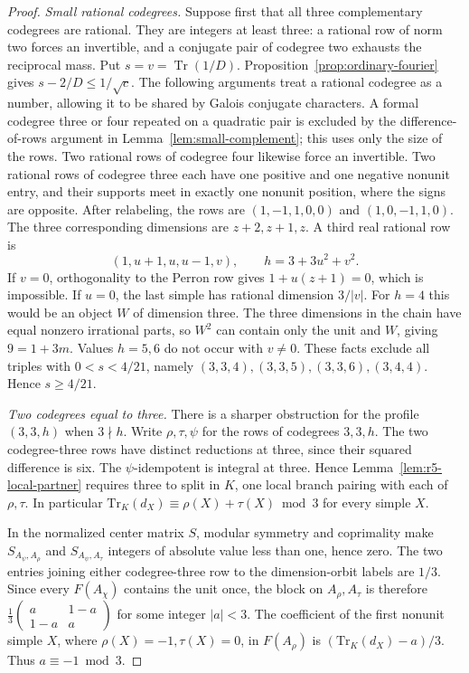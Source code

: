 \documentclass[11pt,a4paper]{article}
\numberwithin{equation}{section}
\begin{document}
\begin{proof}
\par\smallskip\noindent\emph{Small rational codegrees.}\enspace
Suppose first that all three complementary codegrees are rational.
They are integers at least three: a rational row of norm two forces
an invertible, and a conjugate pair of codegree two exhausts the
reciprocal mass. Put $s=v=\operatorname{Tr}(1/D)$.
Proposition~\ref{prop:ordinary-fourier} gives $s-2/D\le1/\sqrt c$.
The following arguments treat a rational codegree as a number, allowing it to be shared by Galois conjugate characters. A formal codegree three or four repeated on a quadratic pair is excluded
by the difference-of-rows argument in Lemma~\ref{lem:small-complement};
this uses only the size of the rows. Two rational rows of codegree four
likewise force an invertible. Two rational rows of codegree three each
have one positive and one negative nonunit entry, and their supports
meet in exactly one nonunit position, where the signs are opposite.
After relabeling, the rows are $(1,-1,1,0,0)$ and $(1,0,-1,1,0)$.
The three corresponding dimensions are $z+2,z+1,z$. A third real
rational row is
\[
 (1,u+1,u,u-1,v),\qquad h=3+3u^2+v^2 .
\]
If $v=0$, orthogonality to the Perron row gives $1+u(z+1)=0$,
which is impossible. If $u=0$, the last simple has rational
dimension $3/|v|$. For $h=4$ this would be an object $W$ of
dimension three. The three dimensions in the chain have equal
nonzero irrational parts, so $W^2$ can contain only the unit and
$W$, giving $9=1+3m$. Values $h=5,6$ do not occur with $v\ne0$.
These facts exclude all triples with
$0<s<4/21$, namely $(3,3,4),(3,3,5),(3,3,6),(3,4,4)$.
Hence $s\ge4/21$.


\par\smallskip\noindent\emph{Two codegrees equal to three.}\enspace
There is a sharper obstruction for the profile $(3,3,h)$ when $3\nmid h$.
Write $\rho,\tau,\psi$ for the rows of codegrees $3,3,h$. The two
codegree-three rows have distinct reductions at three, since their
squared difference is six. The $\psi$-idempotent is integral at three.
Hence Lemma~\ref{lem:r5-local-partner} requires three to split in $K$,
one local branch pairing with each of $\rho,\tau$. In particular
$\mathrm{Tr}_K(d_X)\equiv\rho(X)+\tau(X)\bmod3$ for every simple $X$.

In the normalized center matrix $S$, modular symmetry and coprimality
make $S_{A_\psi,A_\rho}$ and $S_{A_\psi,A_\tau}$ integers of absolute
value less than one, hence zero. The two entries joining either
codegree-three row to the dimension-orbit labels are $1/3$.
Since every $F(A_\chi)$ contains the unit once, the block on
$A_\rho,A_\tau$ is therefore
$\tfrac13\left(\begin{smallmatrix}a&1-a\\1-a&a\end{smallmatrix}\right)$
for some integer $|a|<3$. The coefficient of the first nonunit
simple $X$, where $\rho(X)=-1,\tau(X)=0$, in $F(A_\rho)$ is
$(\mathrm{Tr}_K(d_X)-a)/3$. Thus $a\equiv-1\bmod3$.


\end{proof}
\end{document}
